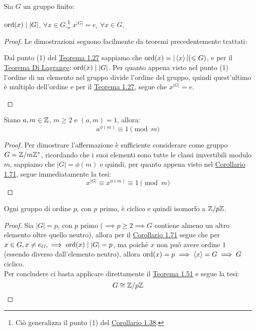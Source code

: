 \documentclass[11pt]{scrartcl}
\begin{document}
\begin{corollary}
\label{g:OrdLagrange}
Sia $G$ un gruppo finito:
	\begin{enumerate}[(1)]
	\ii $\operatorname{ord}(x) \mid |G|$, $\forall x \in G$.\footnote{Ciò generalizza il punto (1) del \hyperref[g:ordiniZn]{Corollario 1.38}.}
	\ii $x^{|G|}=e$, $\forall x \in G$.
	\end{enumerate}
\end{corollary}

\begin{proof}
Le dimostrazioni seguono facilmente da teoremi precedentemente trattati:
	\begin{enumerate}[(1)]
	\ii Dal punto (1) del \hyperref[thm:g_due]{Teorema 1.27} sappiamo che $\operatorname{ord}(x)=|\left<x\right>| (\leqslant G)$, e per il \hyperref[g:Lagrange]{Teorema Di Lagrange}: $\operatorname{ord}(x) \mid |G|$.
	\ii Per quanto appena visto nel punto (1) l'ordine di un elemento nel gruppo divide l'ordine del gruppo, quindi quest'ultimo è multiplo dell'ordine e per il \hyperref[thm:g_due]{Teorema 1.27}, segue che $x^{|G|}=e$.
	\end{enumerate}
\end{proof}

\begin{corollary}
Siano $a,m \in \mathbb Z$, $m \geq 2$ e $(a,m)=1$, allora:
	\[ a^{\phi(m)} \equiv 1 \pmod{m}\]
\end{corollary}

\begin{proof}
Per dimostrare l'affermazione è sufficiente considerare come gruppo $G={\mathbb Z}/m{\mathbb Z}^*$, ricordando che i suoi elementi sono tutte le classi imvertibili modulo $m$, sappiamo che $|G|=\phi(m)$ e quindi, per quanto appena visto nel \hyperref[g:OrdLagrange]{Corollario 1.71}, segue immediatamente la tesi:
	\[ x^{|G|} \equiv x^{\phi(m)} \equiv 1 \pmod{m}
	\]
\end{proof}

\begin{corollary}
\label{g:Gp}
Ogni gruppo di ordine $p$, con $p$ primo, è ciclico e quindi isomorfo a $\mathbb Z/p\mathbb Z$.
\end{corollary}

\begin{proof}
Sia $|G|=p$, con $p$ primo ($\implies p \geq 2 \implies G$ contiene almeno un altro elemento oltre quello neutro), allora per il \hyperref[g:OrdLagrange]{Corollario 1.71} segue che per $x \in G, x \neq e_G, \implies \operatorname{ord}(x) \mid |G| = p$, ma poiché $x$ non può avere ordine $1$ (essendo diverso dall'elemento neutro), allora $\operatorname{ord}(x)=p \implies \left<x\right>=G \implies G$ ciclico. \\
Per concludere ci basta applicare direttamente il \hyperref[g:Iso_ciclici]{Teorema 1.51} e segue la tesi:
	\[ G \cong \mathbb Z/p\mathbb Z 
	\]
\end{proof}
\end{document}
